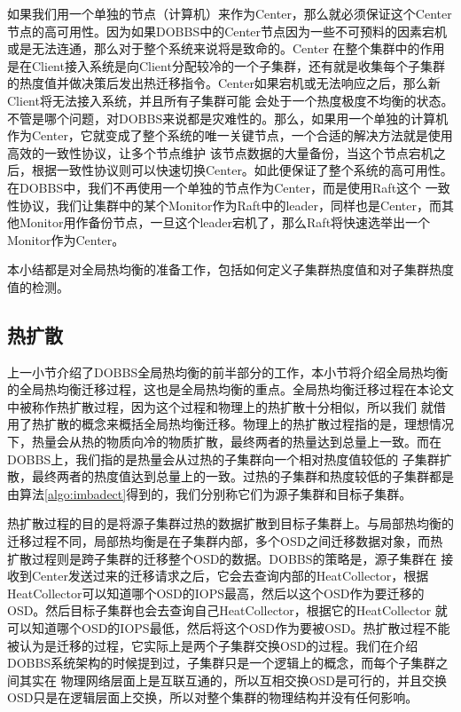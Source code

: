 如果我们用一个单独的节点（计算机）来作为Center，那么就必须保证这个Center节点的高可用性。因为如果DOBBS中的Center节点因为一些不可预料的因素宕机或是无法连通，那么对于整个系统来说将是致命的。Center
在整个集群中的作用是在Client接入系统是向Client分配较冷的一个子集群，还有就是收集每个子集群的热度值并做决策后发出热迁移指令。Center如果宕机或无法响应之后，那么新Client将无法接入系统，并且所有子集群可能
会处于一个热度极度不均衡的状态。不管是哪个问题，对DOBBS来说都是灾难性的。那么，如果用一个单独的计算机作为Center，它就变成了整个系统的唯一关键节点，一个合适的解决方法就是使用高效的一致性协议，让多个节点维护
该节点数据的大量备份，当这个节点宕机之后，根据一致性协议则可以快速切换Center。如此便保证了整个系统的高可用性。在DOBBS中，我们不再使用一个单独的节点作为Center，而是使用Raft\cite{ongaro2014search}这个
一致性协议，我们让集群中的某个Monitor作为Raft中的leader，同样也是Center，而其他Monitor用作备份节点，一旦这个leader宕机了，那么Raft将快速选举出一个Monitor作为Center。

本小结都是对全局热均衡的准备工作，包括如何定义子集群热度值和对子集群热度值的检测。

\subsection{热扩散}
上一小节介绍了DOBBS全局热均衡的前半部分的工作，本小节将介绍全局热均衡的全局热均衡迁移过程，这也是全局热均衡的重点。全局热均衡迁移过程在本论文中被称作热扩散过程，因为这个过程和物理上的热扩散十分相似，所以我们
就借用了热扩散的概念来概括全局热均衡迁移。物理上的热扩散过程指的是，理想情况下，热量会从热的物质向冷的物质扩散，最终两者的热量达到总量上一致。而在DOBBS上，我们指的是热量会从过热的子集群向一个相对热度值较低的
子集群扩散，最终两者的热度值达到总量上的一致。过热的子集群和热度较低的子集群都是由算法\ref{algo:imbadect}得到的，我们分别称它们为源子集群和目标子集群。

热扩散过程的目的是将源子集群过热的数据扩散到目标子集群上。与局部热均衡的迁移过程不同，局部热均衡是在子集群内部，多个OSD之间迁移数据对象，而热扩散过程则是跨子集群的迁移整个OSD的数据。DOBBS的策略是，源子集群在
接收到Center发送过来的迁移请求之后，它会去查询内部的HeatCollector，根据HeatCollector可以知道哪个OSD的IOPS最高，然后以这个OSD作为要迁移的OSD。然后目标子集群也会去查询自己HeatCollector，根据它的HeatCollector
就可以知道哪个OSD的IOPS最低，然后将这个OSD作为要被OSD。热扩散过程不能被认为是迁移的过程，它实际上是两个子集群交换OSD的过程。我们在介绍DOBBS系统架构的时候提到过，子集群只是一个逻辑上的概念，而每个子集群之间其实在
物理网络层面上是互联互通的，所以互相交换OSD是可行的，并且交换OSD只是在逻辑层面上交换，所以对整个集群的物理结构并没有任何影响。

